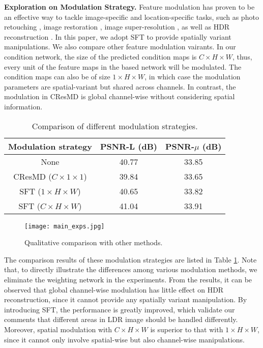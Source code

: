 \documentclass[final]{cvpr}
\begin{document}
\textbf{Exploration on Modulation Strategy.}
Feature modulation has proven to be an effective way to tackle image-specific and location-specific tasks, such as photo retouching \cite{he2020conditional}, image restoration \cite{he2019modulating, he2019interactive}, image super-resolution \cite{wang2018recovering}, as well as HDR reconstruction \cite{kim2019deep}. In this paper, we adopt SFT to provide spatially variant manipulations. We also compare other feature modulation vairants. In our condition network, the size of the predicted condition maps is $C \times H \times W$, thus, every unit of the feature maps in the based network will be modulated. The condition maps can also be of size $1 \times H \times W$, in which case the modulation parameters are spatial-variant but shared across channels. In contrast, the modulation in CResMD \cite{he2019interactive} is global channel-wise without considering spatial information.

\begin{table}[htbp]
	\begin{center}
		\begin{tabular}{ccc}
			\toprule
			Modulation strategy & PSNR-L (dB) & PSNR-$\mu$ (dB) \\ \hline
			None & 40.77 & 33.85 \\ 
			CResMD ($C \times 1 \times 1$) & 39.84 & 33.65 \\ 
			SFT ($1 \times H \times W$) & 40.65 & 33.82 \\ 
			SFT ($C \times H \times W$) & 41.04 & 33.91 \\ 
			\bottomrule
		\end{tabular}
	\end{center}
	\caption{Comparison of different modulation strategies.}
	\label{tab:modulation}
\end{table}

\begin{figure*}[htbp]
    \begin{center}
    \texttt{[image: main\_exps.jpg]}
    \end{center}
    \caption{Qualitative comparison with other methods.}
    \label{Fig: main_exp}
\end{figure*}

The comparison results of these modulation strategies are listed in Table \ref{tab:modulation}. Note that, to directly illustrate the differences among various modulation methods, we eliminate the weighting network in the experiments. From the results, it can be observed that global channel-wise modulation has little effect on HDR reconstruction, since it cannot provide any spatially variant manipulation. By introducing SFT, the performance is greatly improved, which validate our comments that different areas in LDR image should be handled differently. Moreover, spatial modulation with $C \times H \times W$ is superior to that with $1 \times H \times W$, since it cannot only involve spatial-wise but also channel-wise manipulations.
\end{document}
